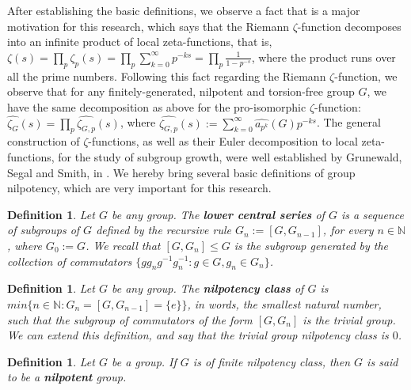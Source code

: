 \documentclass[12pt]{article}
\newtheorem{definition}[theorem]{Definition}
\begin{document}
After establishing the basic definitions, we observe a fact that is a major motivation for this research, which says that the Riemann $\zeta$-function decomposes into an infinite product of local zeta-functions, that is, $\zeta(s)=\prod_p\zeta_p(s)=\prod_p\sum_{k=0}^\infty p^{-ks}=\prod_p\frac{1}{1-p^{-s}}$, where the product runs over all the prime numbers. Following this fact regarding the Riemann $\zeta$-function, we observe that for any finitely-generated, nilpotent and torsion-free group $G$, we have the same decomposition as above for the pro-isomorphic $\zeta$-function: $\hat{\zeta_G}(s)=\prod_p\hat{\zeta_{G,p}}(s)$, where $\hat{\zeta_{G,p}}(s):=\sum_{k=0}^\infty \hat{a_{p^k}}(G)p^{-ks}$. The general construction of $\zeta$-functions, as well as their Euler decomposition to local zeta-functions, for the study of subgroup growth, were well established by Grunewald, Segal and Smith, in \cite{GrunewaldSegalSmith}. We hereby bring several basic definitions of group nilpotency, which are very important for this research.
\begin{definition}
\label{def.lower.central.series}
Let $G$ be any group. The \textbf{lower central series} of $G$ is a sequence of subgroups of $G$ defined by the recursive rule $G_n:=[G,G_{n-1}]$, for every $n\in\mathbb{N}$, where $G_0:=G$.  We recall that $[G,G_n]\leq G$ is the subgroup generated by the collection of commutators $\{gg_ng^{-1}g_n^{-1} : g\in G,g_n\in G_n\}$.
\end{definition}
\begin{definition}
\label{def.nilpotency.class}
Let $G$ be any group. The \textbf{nilpotency class} of $G$ is $min\{n\in\mathbb{N} : G_n=[G,G_{n-1}]=\{e\}\}$, in words, the smallest natural number, such that the subgroup of commutators of the form $[G,G_n]$ is the trivial group. We can extend this definition, and say that the trivial group nilpotency class is $0$.
\end{definition}
\begin{definition}
\label{def.nilpotent.group}
Let $G$ be a group. If $G$ is of finite nilpotency class, then $G$ is said to be a \textbf{nilpotent} group.
\end{definition}
\end{document}
